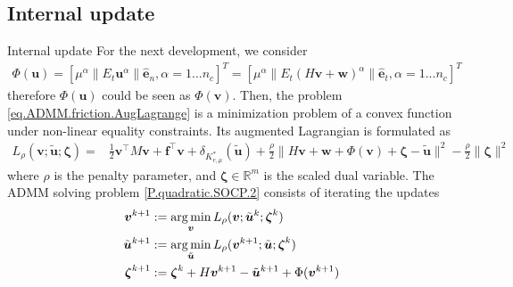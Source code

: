 \documentclass[8pt,red]{beamer}
\theoremstyle{plain}
\theoremstyle{definition}
\theoremstyle{remark}
\newcommand{\argmin}{\operatornamewithlimits{\mathrm{arg\,min}}}
\renewcommand{\Re}{\ensuremath{\mathbb{R}}}
\newcommand{\bi}[1]{\ensuremath{\boldsymbol{#1}}}
\begin{document}
\subsection{Internal update}
\begin{frame}{Internal update}
For the next development, we consider
\begin{align}
	\Phi(\bi{u})
	= [\mu^{\alpha} \| E_{t} \bi{u}^{\alpha} \| \hat{\bi{e}}_{n}, \alpha = 1...n_{c}]^{T}
	= [\mu^{\alpha} \| E_{t} \left( H \bi{v} + \bi{w} \right)^{\alpha} \| \hat{\bi{e}}_{t}, \alpha = 1...n_{c}]^{T}
\end{align}
therefore $\Phi(\bi{u})$ could be seen as $\Phi(\bi{v})$. Then, the problem \eqref{eq.ADMM.friction.AugLagrange} is a minimization problem of a convex 
function under non-linear equality constraints. 
Its augmented Lagrangian is formulated as 
\begin{align}
  L_{\rho}(\bi{v};\tilde{\bi{u}};\bi{\zeta}) 
  =& \frac{1}{2} \bi{v}^{\top} M \bi{v} + \bi{f}^{\top} \bi{v} 
  +  \delta_{K_{e,\mu}^{*}}(\tilde{\bi{u}}) +  \frac{\rho}{2} 
  \| H \bi{v} + \bi{w} + \Phi(\bi{v}) + \bi{\zeta}  - \tilde{\bi{u}} \|^{2}
    - \frac{\rho}{2} \| \bi{\zeta}\|^{2} 
\end{align}
where $\rho$ is the penalty parameter, and $\bi{\zeta} \in \Re^{m}$ is  the scaled dual variable. The ADMM solving problem \eqref{P.quadratic.SOCP.2} consists of 
iterating the updates 
\begin{align}
  \bi{v}^{k+1} 
  &:= \argmin_{\bi{v}} 
  L_{\rho}(\bi{v};\tilde{\bi{u}}^{k};\bi{\zeta}^{k})   
  \label{eq.ADMM.friction.1.1new} \\
  \tilde{\bi {u}}^{k+1}
  &:= \argmin_{\tilde{\bi{u}}} 
    L_{\rho}(\bi{v}^{k+1};\tilde{\bi{u}};\bi{\zeta}^{k}) 
    \label{eq.ADMM.friction.1.2new} \\
  \bi{\zeta}^{k+1} &:= \bi{\zeta}^{k} 
  + 
  H \bi{v}^{k+1} - \tilde{\bi{u}}^{k+1} + \Phi(\bi{v}^{k+1})  
  \label{eq.ADMM.friction.1.3bis}
\end{align}
\end{frame}
\end{document}
